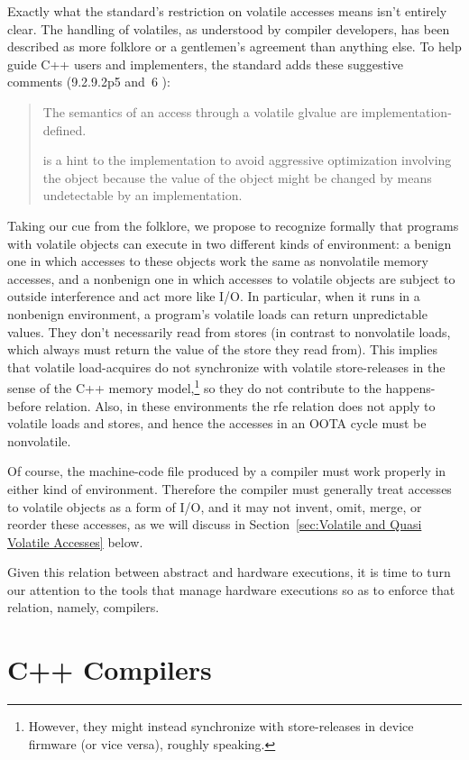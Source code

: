 Exactly what the standard's restriction on volatile accesses means
isn't entirely clear.
The handling of volatiles, as understood by compiler developers, has
been described as more folklore or a gentlemen's agreement than
anything else.
To help guide C++ users and implementers, the standard adds these
suggestive comments (9.2.9.2p5 and~6 ):
\begin{quote}
	The semantics of an access through a volatile glvalue are
	implementation-defined.

	 is a hint to the implementation to avoid aggressive
	optimization involving the object because the value of the object
	might be changed by means undetectable by an implementation.
\end{quote}

Taking our cue from the folklore, we propose to recognize formally
that programs with volatile objects can execute in two different kinds
of environment: a benign one in which accesses to these objects work
the same as nonvolatile memory accesses, and a nonbenign one in which
accesses to volatile objects are subject to outside interference and
act more like I/O.
In particular, when it runs in a nonbenign environment, a program's
volatile loads can return unpredictable values.
They don't necessarily read from stores (in contrast to nonvolatile loads,
which always must return the value of the store they read from).
This implies that volatile load-acquires do not synchronize with
volatile store-releases in the sense of the C++ memory model,\footnote{
	However, they might instead synchronize with store-releases in
	device firmware (or vice versa), roughly speaking.}
so they do not contribute to the happens-before relation.
Also, in these environments the rfe relation does not apply to volatile
loads and stores, and hence the accesses in an OOTA cycle must be nonvolatile.

Of course, the machine-code file produced by a compiler must work
properly in either kind of environment.
Therefore the compiler must generally treat accesses to volatile objects
as a form of I/O, and it may not
invent, omit, merge, or reorder these accesses, as we will discuss in
Section~\ref{sec:Volatile and Quasi Volatile Accesses} below.

Given this relation between abstract and hardware executions, it is time
to turn our attention to the tools that manage hardware executions so as
to enforce that relation, namely, compilers.

\section{C++ Compilers}
\label{sec:C++ Compilers}

